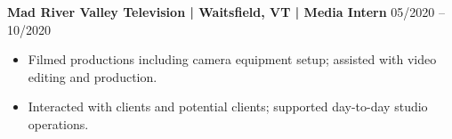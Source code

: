 \noindent
\textbf{Mad River Valley Television | Waitsfield, VT | Media Intern} \hfill 05/2020 -- 10/2020
\begin{itemize}
    \item Filmed productions including camera equipment setup; assisted with video editing and production.
    \item Interacted with clients and potential clients; supported day-to-day studio operations.
\end{itemize}
